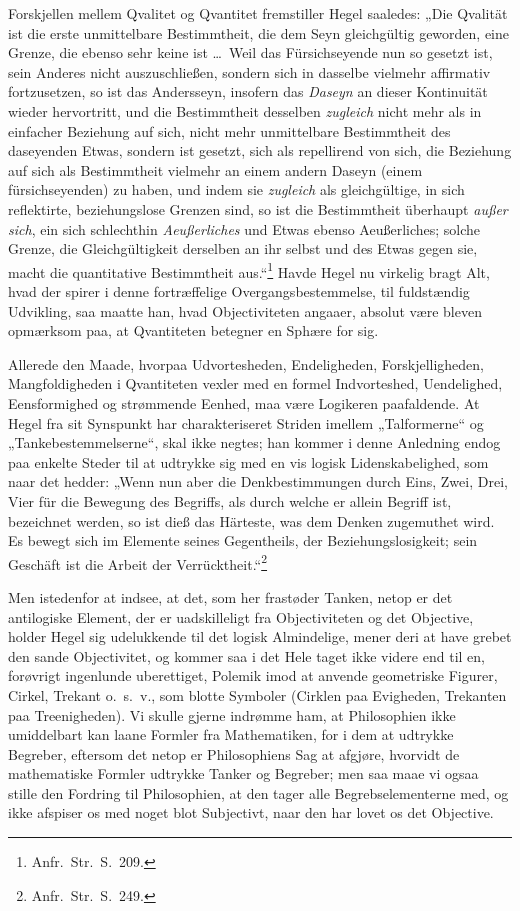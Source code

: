 \documentclass[12pt]{book}
\newcommand{\opage}[1]{\marginnote{\footnotesize\textit{[#1]}}}
\begin{document}
Forskjellen mellem Qvalitet og Qvantitet fremstiller Hegel saaledes: „Die Qvalität ist die erste
unmittelbare Bestimmtheit, die dem Seyn gleichgültig geworden, eine Grenze, die ebenso sehr keine ist
\ldots\ Weil das Fürsichseyende nun so gesetzt ist, sein Anderes nicht auszuschließen, sondern sich in
dasselbe vielmehr affirmativ fortzusetzen, so ist das Andersseyn, insofern das \emph{Daseyn} an dieser
Kontinuität wieder hervortritt, und die Bestimmtheit desselben \emph{zugleich} nicht mehr als in
einfacher Beziehung auf sich, nicht mehr unmittelbare Bestimmtheit des daseyenden Etwas, sondern ist
gesetzt, sich als repellirend von sich, die Beziehung auf sich als Bestimmtheit vielmehr an einem
andern Daseyn (einem fürsichseyenden) zu
\opage{295} haben, und indem sie \emph{zugleich} als gleichgültige, in sich reflektirte, beziehungslose Grenzen
sind, so ist die Bestimmtheit überhaupt \emph{außer sich}, ein sich schlechthin \emph{Aeußerliches} und
Etwas ebenso Aeußerliches; solche Grenze, die Gleichgültigkeit derselben an ihr selbst und des Etwas
gegen sie, macht die quantitative Bestimmtheit aus.“\footnote{Anfr.\ Str.\ S.~209.} Havde Hegel nu
virkelig bragt Alt, hvad der spirer i denne fortræffelige Overgangsbestemmelse, til fuldstændig
Udvikling, saa maatte han, hvad Objectiviteten angaaer, absolut være bleven opmærksom paa, at
Qvantiteten betegner en Sphære for sig.

Allerede den Maade, hvorpaa Udvortesheden, Endeligheden, Forskjelligheden, Mangfoldigheden i
Qvantiteten vexler med en formel Indvorteshed, Uendelighed, Eensformighed og strømmende Eenhed, maa
være Logikeren paafaldende. At Hegel fra sit Synspunkt har charakteriseret Striden imellem
„Talformerne“ og „Tankebestemmelserne“, skal ikke negtes; han kommer i denne Anledning endog paa
enkelte Steder til at udtrykke sig med en vis logisk Lidenskabelighed, som naar det hedder: „Wenn nun
aber die Denkbestimmungen durch Eins, Zwei, Drei, Vier für die Bewegung des Begriffs, als durch welche
er allein Begriff ist, bezeichnet werden, so ist dieß das Härteste, was dem Denken zugemuthet wird. Es
bewegt sich im Elemente seines Gegentheils, der Beziehungslosigkeit; sein Geschäft ist die Arbeit der
Verrücktheit.“\footnote{Anfr.\ Str.\ S.~249.}

Men istedenfor at indsee, at det, som her frastøder Tanken, netop er det antilogiske Element, der er
uadskilleligt fra Objectiviteten og det Objective, holder Hegel sig udelukkende til det logisk
Almindelige, mener deri at have grebet den sande Objectivitet, og kommer saa i det Hele taget ikke
videre end til en, forøvrigt ingenlunde uberettiget, Polemik imod at anvende geometriske Figurer,
Cirkel, Trekant
\opage{296} o.\ s.\ v., som blotte Symboler (Cirklen paa Evigheden, Trekanten paa Treenigheden). Vi skulle gjerne
indrømme ham, at Philosophien ikke umiddelbart kan laane Formler fra Mathematiken, for i dem at
udtrykke Begreber, eftersom det netop er Philosophiens Sag at afgjøre, hvorvidt de mathematiske Formler
udtrykke Tanker og Begreber; men saa maae vi ogsaa stille den Fordring til Philosophien, at den tager
alle Begrebselementerne med, og ikke afspiser os med noget blot Subjectivt, naar den har lovet os det
Objective.
\end{document}
